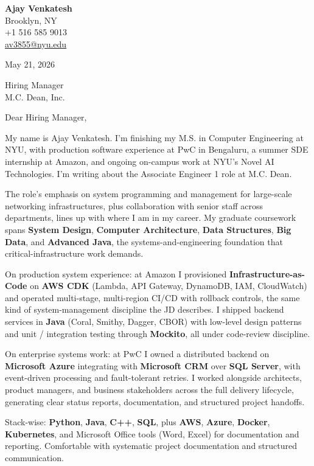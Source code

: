 \documentclass[letterpaper,11pt]{article}
\begin{document}
\begin{flushleft}
\textbf{\large Ajay Venkatesh} \\
Brooklyn, NY \\
+1 516 585 9013 \\
\href{mailto:av3855@nyu.edu}{av3855@nyu.edu}
\end{flushleft}
\vspace{10pt}
May 21, 2026
\vspace{6pt}

Hiring Manager \\
M.C. Dean, Inc.

\vspace{10pt}

Dear Hiring Manager,

My name is Ajay Venkatesh. I'm finishing my M.S. in Computer Engineering at NYU, with production software experience at PwC in Bengaluru, a summer SDE internship at Amazon, and ongoing on-campus work at NYU's Novel AI Technologies. I'm writing about the Associate Engineer 1 role at M.C. Dean.

The role's emphasis on system programming and management for large-scale networking infrastructures, plus collaboration with senior staff across departments, lines up with where I am in my career. My graduate coursework spans \textbf{System Design}, \textbf{Computer Architecture}, \textbf{Data Structures}, \textbf{Big Data}, and \textbf{Advanced Java}, the systems-and-engineering foundation that critical-infrastructure work demands.

On production system experience: at Amazon I provisioned \textbf{Infrastructure-as-Code} on \textbf{AWS CDK} (Lambda, API Gateway, DynamoDB, IAM, CloudWatch) and operated multi-stage, multi-region CI/CD with rollback controls, the same kind of system-management discipline the JD describes. I shipped backend services in \textbf{Java} (Coral, Smithy, Dagger, CBOR) with low-level design patterns and unit / integration testing through \textbf{Mockito}, all under code-review discipline.

On enterprise systems work: at PwC I owned a distributed backend on \textbf{Microsoft Azure} integrating with \textbf{Microsoft CRM} over \textbf{SQL Server}, with event-driven processing and fault-tolerant retries. I worked alongside architects, product managers, and business stakeholders across the full delivery lifecycle, generating clear status reports, documentation, and structured project handoffs.

Stack-wise: \textbf{Python}, \textbf{Java}, \textbf{C++}, \textbf{SQL}, plus \textbf{AWS}, \textbf{Azure}, \textbf{Docker}, \textbf{Kubernetes}, and Microsoft Office tools (Word, Excel) for documentation and reporting. Comfortable with systematic project documentation and structured communication.
\end{document}
